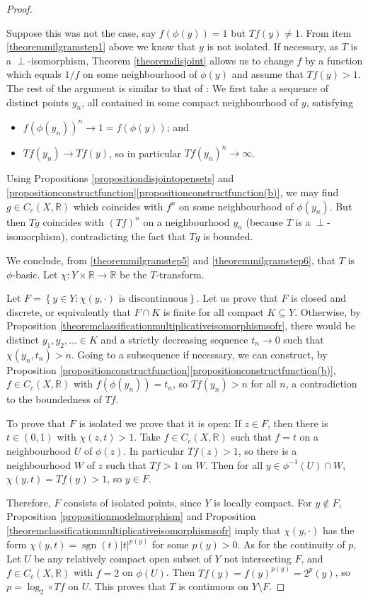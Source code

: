 \documentclass[letter,11pt]{amsart}
\theoremstyle{plain}		\newtheorem{theorem}[generalnumbering]{Theorem}
\theoremstyle{plain}		\newtheorem{corollary}[generalnumbering]{Corollary}
\theoremstyle{definition}		\newtheorem{definition}[generalnumbering]{Definition}
\theoremstyle{definition}		\newtheorem{example}[generalnumbering]{Example}
\theoremstyle{plain}		\newtheorem{proposition}[generalnumbering]{Proposition}
\theoremstyle{plain}		\newtheorem{lemma}[generalnumbering]{Lemma}
\theoremstyle{plain}    \newtheorem{plainstyle}[generalnumbering]{\namefordifferentenvironment}
\theoremstyle{plain}    \newtheorem*{plainstyle*}{\namefordifferentenvironment}
\theoremstyle{definition}    \newtheorem{definitionstyle}[generalnumbering]{\namefordifferentenvironment}
\theoremstyle{definition}    \newtheorem*{definitionstyle*}{\namefordifferentenvironment}
\begin{document}
\begin{proof}
\begin{enumerate}[label=\arabic*.]
		Suppose this was not the case, say $f(\phi(y))=1$ but $Tf(y)\neq 1$. From item \ref{theoremmilgramstep1} above we know that $y$ is not isolated. If necessary, as $T$ is a $\perp$-isomorphism, Theorem \ref{theoremdisjoint} allows us to change $f$ by a function which equals $1/f$ on some neighbourhood of $\phi(y)$ and assume that $Tf(y)>1$. The rest of the argument is similar to that of \cite[Lemma 4.1]{MR0029476}: We first take a sequence of distinct points $y_n$, all contained in some compact neighbourhood of $y$, satisfying
		\begin{itemize}
			\item $f(\phi(y_n))^n\to 1=f(\phi(y))$; and 
			\item $Tf(y_n)\to Tf(y)$, so in particular $Tf(y_n)^n\to\infty$.
		\end{itemize}
		Using Propositions \ref{propositiondisjointopensets} and \ref{propositionconstructfunction}\ref{propositionconstructfunction(b)}, we may find $g\in C_c(X,\mathbb{R})$ which coincides with $f^n$ on some neighbourhood of $\phi(y_n)$. But then $Tg$ coincides with $(Tf)^n$ on a neighbourhood $y_n$ (because $T$ is a $\perp$-isomorphism), contradicting the fact that $Tg$ is bounded.
	\end{enumerate}
	
	We conclude, from \ref{theoremmilgramstep5} and \ref{theoremmilgramstep6}, that $T$ is $\phi$-basic. Let $\chi\colon Y\times\mathbb{R}\to\mathbb{R}$ be the $T$-transform.
	
	Let $F=\left\{y\in Y:\chi(y,\cdot)\text{ is discontinuous}\right\}$. Let us prove that $F$ is closed and discrete, or equivalently that $F\cap K$ is finite for all compact $K\subseteq Y$. Otherwise, by Proposition \ref{theoremclassificationmultiplicativeisomorphismsofr}, there would be distinct $y_1,y_2,\ldots\in K$ and a strictly decreasing sequence $t_n\to 0$ such that $\chi(y_n,t_n)>n$. Going to a subsequence if necessary, we can construct, by Proposition \ref{propositionconstructfunction}\ref{propositionconstructfunction(b)}, $f\in C_c(X,\mathbb{R})$ with $f(\phi(y_n))=t_n$, so $Tf(y_n)>n$ for all $n$, a contradiction to the boundedness of $Tf$.
	
	To prove that $F$ is isolated we prove that it is open: If $z\in F$, then there is $t\in(0,1)$ with $\chi(z,t)>1$. Take $f\in C_c(X,\mathbb{R})$ such that $f=t$ on a neighbourhood $U$ of $\phi(z)$. In particular $Tf(z)>1$, so there is a neighbourhood $W$ of $z$ such that $Tf>1$ on $W$. Then for all $y\in\phi^{-1}(U)\cap W$, $\chi(y,t)=Tf(y)>1$, so $y\in F$.
	
	Therefore, $F$ consists of isolated points, since $Y$ is locally compact. For $y\not\in F$, Proposition \ref{propositionmodelmorphism} and Proposition \ref{theoremclassificationmultiplicativeisomorphismsofr} imply that $\chi(y,\cdot)$ has the form $\chi(y,t)=\operatorname{sgn}(t)|t|^{p(y)}$ for some $p(y)>0$. As for the continuity of $p$, Let $U$ be any relatively compact open subset of $Y$ not intersecting $F$, and $f\in C_c(X,\mathbb{R})$ with $f=2$ on $\phi(U)$. Then $Tf(y)=f(y)^{p(y)}=2^p(y)$, so $p=\log_{2}\circ Tf$ on $U$. This proves that $T$ is continuous on $Y\setminus F$.\qedhere
\end{proof}
\end{document}
